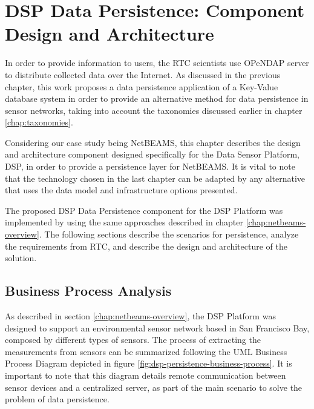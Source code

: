 

\chapter{DSP Data Persistence: Component Design and Architecture}

In order to provide information to users, the RTC scientists use OPeNDAP
\cite{opendap} server to distribute collected data over the Internet. As
discussed in the previous chapter, this work proposes a data persistence
application of a Key-Value database system in order to provide an alternative
method for data persistence in sensor networks, taking into account the
taxonomies discussed earlier in chapter \ref{chap:taxonomies}.

Considering our case study being NetBEAMS, this chapter describes the design
and architecture component designed specifically for the Data Sensor Platform,
DSP, in order to provide a persistence layer for NetBEAMS. It is vital to note
that the technology chosen in the last chapter can be adapted by any
alternative that uses the data model and infrastructure options presented.

The proposed DSP Data Persistence component for the DSP
Platform was implemented by using the same approaches described in chapter
\ref{chap:netbeams-overview}. The following sections describe the scenarios for
persistence, analyze the requirements from RTC, and describe the design and
architecture of the solution.

\section{Business Process Analysis}
\label{sec:business-process-analysis}

As described in section \ref{chap:netbeams-overview}, the DSP Platform was
designed to support an environmental sensor network based in San Francisco Bay,
composed by different types of sensors. The process of extracting the
measurements from sensors can be summarized following the UML Business Process
Diagram \cite{uml} depicted in figure
\ref{fig:dsp-persistence-business-process}. It is important to note that this
diagram details remote communication between sensor devices and a centralized
server, as part of the main scenario to solve the problem of data persistence.

